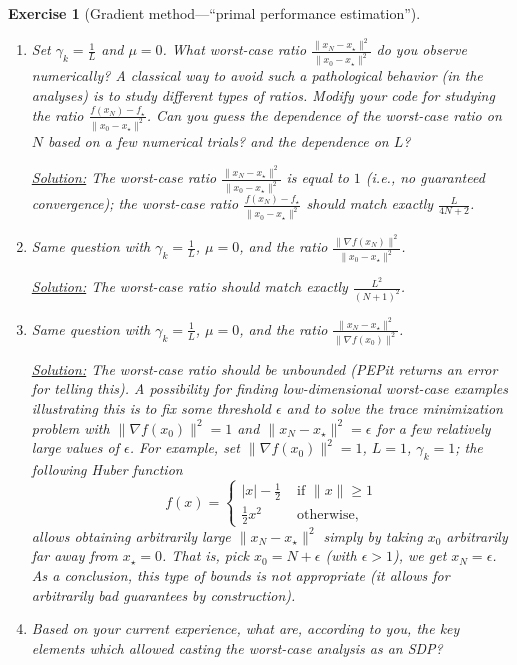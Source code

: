 \documentclass[11pt,a4paper]{article}
\newcommand{\pepit}{{PEPit }}
\newcommand{\correction}[1]{{{\color{blue}\underline{Solution:} #1}}}
\newcommand{\correction}[1]{}
\newtheorem{exercise}{Exercise}
\begin{document}
\begin{exercise}[Gradient method---``primal performance estimation'']
\begin{enumerate}
	\item Set $\gamma_k=\tfrac{1}{L}$ and $\mu=0$. What worst-case ratio $\frac{\|x_{N}-x_\star\|^2}{\|x_0-x_\star\|^2}$ do you observe numerically? A classical way to avoid such a pathological behavior  (in the analyses) is to study different types of ratios. Modify your code for studying the ratio $\frac{f(x_N)-f_\star}{\|x_0-x_\star\|^2}$. Can you guess the dependence of the worst-case ratio on $N$ based on a few numerical trials? and the dependence on $L$?
	
	\correction{The worst-case ratio $\frac{\|x_{N}-x_\star\|^2}{\|x_0-x_\star\|^2}$ is equal to $1$ (i.e., no guaranteed convergence); the worst-case ratio $\frac{f(x_N)-f_\star}{\|x_0-x_\star\|^2}$ should match exactly $\frac{L}{4N+2}$.}
	
	
	\item Same question with $\gamma_k=\tfrac{1}{L}$, $\mu=0$, and the ratio $\frac{\|\nabla f(x_N)\|^2}{\|x_0-x_\star\|^2}$.
	
	\correction{The worst-case ratio should match exactly $\frac{L^2}{(N+1)^2}$.}
	
	\item Same question with $\gamma_k=\tfrac{1}{L}$, $\mu=0$, and the ratio $\frac{\|x_N-x_\star\|^2}{\|\nabla f(x_0)\|^2}$.
	
	\correction{The worst-case ratio should be unbounded (\pepit returns an error for telling this). A possibility for finding low-dimensional worst-case examples illustrating this is to fix some threshold $\epsilon$ and to solve the trace minimization problem with $\|\nabla f(x_0)\|^2=1$ and $\|x_N-x_\star\|^2=\epsilon$ for a few relatively large values of $\epsilon$. For example, set $\|\nabla f(x_0)\|^2=1$, $L=1$, $\gamma_k=1$; the following Huber function
\begin{equation}
f(x)=\left\{\begin{array}{ll}
|x| - \tfrac{1}{2} & \text{ if } \|x\|\geqslant 1\\
\tfrac{1}{2}x^2 & \text{ otherwise, }
\end{array}\right.
\end{equation}	
allows obtaining arbitrarily large $\|x_N-x_\star\|^2$ simply by taking $x_0$ arbitrarily far away from $x_\star=0$. That is, pick $x_0=N+\epsilon$ (with $\epsilon>1$), we get $x_N=\epsilon$. As a conclusion, this type of bounds is not appropriate (it allows for arbitrarily bad guarantees by construction).}
	
	\item Based on your current experience, what are, according to you, the key elements which allowed casting the worst-case analysis as an SDP?
	

\end{enumerate}
\end{exercise}
\end{document}
